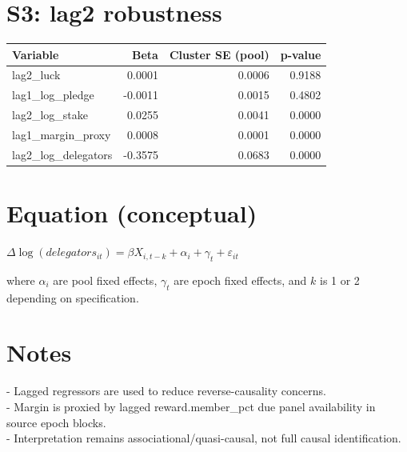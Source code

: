 \documentclass[11pt]{article}
\begin{document}
\section*{S3: lag2 robustness}
\begin{table}[h]
\centering
\small
\begin{tabular}{lrrr}
\toprule
Variable & Beta & Cluster SE (pool) & p-value \\
\midrule
lag2\_luck & 0.0001 & 0.0006 & 0.9188 \\
lag1\_log\_pledge & -0.0011 & 0.0015 & 0.4802 \\
lag2\_log\_stake & 0.0255 & 0.0041 & 0.0000 \\
lag1\_margin\_proxy & 0.0008 & 0.0001 & 0.0000 \\
lag2\_log\_delegators & -0.3575 & 0.0683 & 0.0000 \\
\bottomrule
\end{tabular}
\end{table}

\section*{Equation (conceptual)}
$\Delta \log(delegators_{it}) = \beta X_{i,t-k} + \alpha_i + \gamma_t + \varepsilon_{it}$

where $\alpha_i$ are pool fixed effects, $\gamma_t$ are epoch fixed effects, and $k$ is 1 or 2 depending on specification.

\section*{Notes}
- Lagged regressors are used to reduce reverse-causality concerns.\\
- Margin is proxied by lagged reward.member\_pct due panel availability in source epoch blocks.\\
- Interpretation remains associational/quasi-causal, not full causal identification.\\
\end{document}

